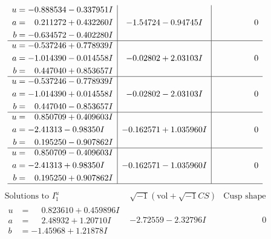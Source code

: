 \documentclass[1p]{elsarticle_modified}
\theoremstyle{definition}
\newcommand{\I}{\sqrt{-1}}
\begin{document}
$$\begin{array}{c|c|c}
\begin{aligned}
u &= -0.888534 - 0.337951 I \\
a &= \phantom{-}0.211272 + 0.432260 I \\
b &= -0.634572 - 0.402280 I\end{aligned}
 & -1.54724 - 0.94745 I & \phantom{-0.000000 } 0 \\ \hline\begin{aligned}
u &= -0.537246 + 0.778939 I \\
a &= -1.014390 - 0.014558 I \\
b &= \phantom{-}0.447040 + 0.853657 I\end{aligned}
 & -0.02802 + 2.03103 I & \phantom{-0.000000 } 0 \\ \hline\begin{aligned}
u &= -0.537246 - 0.778939 I \\
a &= -1.014390 + 0.014558 I \\
b &= \phantom{-}0.447040 - 0.853657 I\end{aligned}
 & -0.02802 - 2.03103 I & \phantom{-0.000000 } 0 \\ \hline\begin{aligned}
u &= \phantom{-}0.850709 + 0.409603 I \\
a &= -2.41313 - 0.98350 I \\
b &= \phantom{-}0.195250 - 0.907862 I\end{aligned}
 & -0.162571 + 1.035960 I & \phantom{-0.000000 } 0 \\ \hline\begin{aligned}
u &= \phantom{-}0.850709 - 0.409603 I \\
a &= -2.41313 + 0.98350 I \\
b &= \phantom{-}0.195250 + 0.907862 I\end{aligned}
 & -0.162571 - 1.035960 I & \phantom{-0.000000 } 0\\
 \hline 
 \end{array}$$\newpage$$\begin{array}{c|c|c}  
\text{Solutions to }I^u_{1}& \I (\text{vol} + \sqrt{-1}CS) & \text{Cusp shape}\\
 \hline 
\begin{aligned}
u &= \phantom{-}0.823610 + 0.459896 I \\
a &= \phantom{-}2.48932 + 1.20710 I \\
b &= -1.45968 + 1.21878 I\end{aligned}
 & -2.72559 - 2.32796 I & \phantom{-0.000000 } 0 \\ \hline\begin{aligned}

\end{aligned}
\end{array}$$
\end{document}
